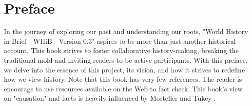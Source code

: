 \documentclass[a4paper,12pt]{book}
\begin{document}
\begin{titlepage}
\end{titlepage}



\tableofcontents
\cleardoublepage

\chapter*{Preface}
In the journey of exploring our past and understanding our roots, "World History in Brief - WHiB - Version 0.3" aspires to be more than just another historical account. This book strives to foster collaborative history-making, breaking the traditional mold and inviting readers to be active participants. With this preface, we delve into the essence of this project, its vision, and how it strives to redefine how we view history. Note that this book has very few references. The reader is encourage to use resources available on the Web to fact check. This book's view on "causation" and facts is heavily influenced by Mosteller and Tukey \cite{mosteller1977}.
\end{document}
